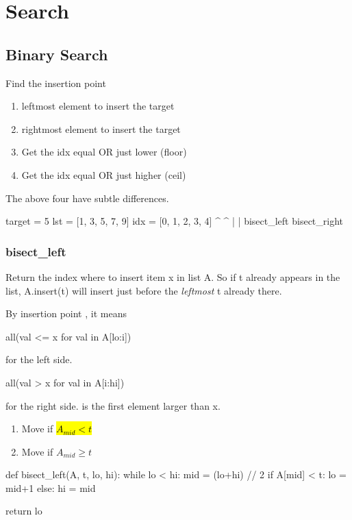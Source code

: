 \chapter{Search}

\section{Binary Search}
Find the insertion point
\begin{enumerate}
\item {} leftmost element to insert the target
\item {} rightmost element to insert the target
\item Get the idx equal OR just lower (floor)
\item Get the idx equal OR just higher (ceil)
\end{enumerate}
The above four have subtle differences.

\begin{python}
target = 5
lst = [1, 3, 5, 7, 9]
idx = [0, 1, 2, 3, 4]
             ^  ^
             |  |
   bisect_left  bisect_right
\end{python}

\subsection{bisect\_left}
Return the index where to insert item x in list A. So if t already appears in the list,
A.insert(t) will insert just before the \textit{leftmost} t already there.

By insertion point , it means \begin{python}
all(val <= x for val in A[lo:i])
\end{python} for the left side. 
\begin{python}
all(val > x for val in A[i:hi])
\end{python} for the right side.  is the first element larger than x. 
\begin{enumerate}
\item Move  if \hl{$A_{mid} < t$}
\item Move  if $A_{mid} \geq t$
\end{enumerate}

\begin{python}
def bisect_left(A, t, lo, hi):
    while lo < hi:
        mid = (lo+hi) // 2
        if A[mid] < t:
            lo = mid+1   
        else:
            hi = mid

    return lo
\end{python}

